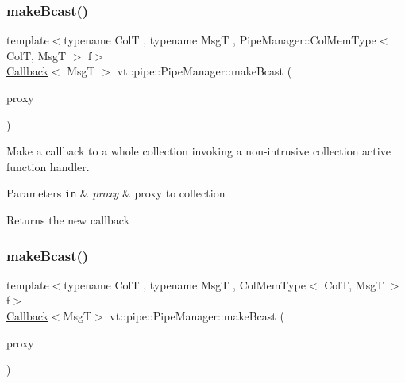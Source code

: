 \subsubsection{\texorpdfstring{make\+Bcast()}{makeBcast()}\hspace{0.1cm}{\footnotesize\ttfamily [4/6]}}
{\footnotesize\ttfamily template$<$typename ColT , typename MsgT , Pipe\+Manager\+::\+Col\+Mem\+Type$<$ Col\+T, Msg\+T $>$ f$>$ \\
\hyperlink{namespacevt_a36db99df4c973d48b1118a293fff533f}{Callback}$<$ MsgT $>$ vt\+::pipe\+::\+Pipe\+Manager\+::make\+Bcast (\begin{DoxyParamCaption}\item[{\hyperlink{structvt_1_1pipe_1_1_pipe_manager_t_l_af56c58cad882496e35f01227d4da3898}{Col\+Proxy\+Type}$<$ ColT $>$}]{proxy }\end{DoxyParamCaption})}



Make a callback to a whole collection invoking a non-\/intrusive collection active function handler. 


\begin{DoxyParams}[1]{Parameters}
\mbox{\tt in}  & {\em proxy} & proxy to collection\\
\hline
\end{DoxyParams}
\begin{DoxyReturn}{Returns}
the new callback 
\end{DoxyReturn}
\mbox{\label{structvt_1_1pipe_1_1_pipe_manager_a6fb7d87f8beb2c1e80d492df47036158}} 
\subsubsection{\texorpdfstring{make\+Bcast()}{makeBcast()}\hspace{0.1cm}{\footnotesize\ttfamily [5/6]}}
{\footnotesize\ttfamily template$<$typename ColT , typename MsgT , Col\+Mem\+Type$<$ Col\+T, Msg\+T $>$ f$>$ \\
\hyperlink{namespacevt_a36db99df4c973d48b1118a293fff533f}{Callback}$<$MsgT$>$ vt\+::pipe\+::\+Pipe\+Manager\+::make\+Bcast (\begin{DoxyParamCaption}\item[{\hyperlink{structvt_1_1pipe_1_1_pipe_manager_t_l_af56c58cad882496e35f01227d4da3898}{Col\+Proxy\+Type}$<$ ColT $>$}]{proxy }\end{DoxyParamCaption})}



